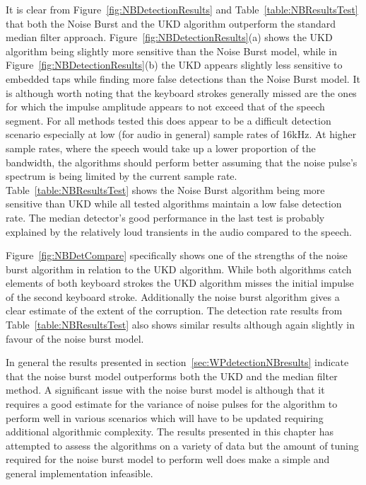 It is clear from Figure~\ref{fig:NBDetectionResults} and Table~\ref{table:NBResultsTest} that both the Noise Burst and the UKD algorithm outperform the standard median filter approach. Figure~\ref{fig:NBDetectionResults}(a) shows the UKD algorithm being slightly more sensitive than the Noise Burst model, while in Figure~\ref{fig:NBDetectionResults}(b) the UKD appears slightly less sensitive to embedded taps while finding more false detections than the Noise Burst model. It is although worth noting that the keyboard strokes generally missed are the ones for which the impulse amplitude appears to not exceed that of the speech segment. For all methods tested this does appear to be a difficult detection scenario especially at low (for audio in general) sample rates of 16kHz. At higher sample rates, where the speech would take up a lower proportion of the bandwidth, the algorithms should perform better assuming that the noise pulse's spectrum is being limited by the current sample rate. Table~\ref{table:NBResultsTest} shows the Noise Burst algorithm being more sensitive than UKD while all tested algorithms maintain a low false detection rate. The median detector's good performance in the last test is probably explained by the relatively loud transients in the audio compared to the speech.

Figure~\ref{fig:NBDetCompare} specifically shows one of the strengths of the noise burst algorithm in relation to the UKD algorithm. While both algorithms catch elements of both keyboard strokes the UKD algorithm misses the initial impulse of the second keyboard stroke. Additionally the noise burst algorithm gives a clear estimate of the extent of the corruption. The detection rate results from Table~\ref{table:NBResultsTest} also shows similar results although again slightly in favour of the noise burst model.

In general the results presented in section~\ref{sec:WPdetectionNBresults} indicate that the noise burst model outperforms both the UKD and the median filter method. A significant issue with the noise burst model is although that it requires a good estimate for the variance of noise pulses for the algorithm to perform well in various scenarios which will have to be updated requiring additional algorithmic complexity. The results presented in this chapter has attempted to assess the algorithms on a variety of data but the amount of tuning required for the noise burst model to perform well does make a simple and general implementation infeasible.

